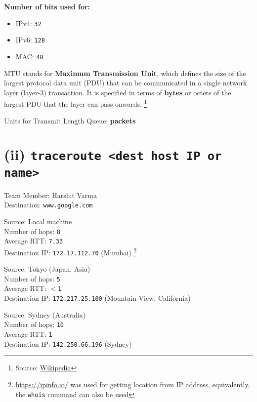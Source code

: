 \documentclass[11pt, fleqn]{article}
\begin{document}
\hrulefill
\medskip

\textbf{Number of bits used for:}
\begin{itemize}[itemsep=-1ex]
    \item IPv4: \texttt{32}
    \item IPv6: \texttt{128}
    \item MAC: \texttt{48}
\end{itemize}

\hrulefill
\medskip 

MTU stands for \textbf{Maximum Transmission Unit}, which defines the size of the largest protocol data unit (PDU) that can be communicated in a single network layer (layer-3) transaction. It is specified in terms of \textbf{bytes} or octets of the largest PDU that the layer can pass onwards. \footnote{Source:  \href{https://en.wikipedia.org/wiki/Maximum_transmission_unit}{Wikipedia} }

\hrulefill
\medskip

Units for Transmit Length Queue: \textbf{packets}


\newpage
\section*{(ii) \texttt{traceroute <dest host IP or name>}}
\label{partb}
\setcounter{equation}{0}

Team Member: Harshit Varma\\
Destination: \texttt{www.google.com}

\hrulefill
\smallskip

Source: Local machine\\
Number of hops: \texttt{8}\\
Average RTT: \texttt{7.33}\\
Destination IP: \texttt{172.17.112.70} (Mumbai) \footnote{\url{https://ipinfo.io/} was used for getting location from IP address, equivalently, the \texttt{whois} command can also be used}

\hrulefill
\smallskip

Source: Tokyo (Japan, Asia)\\
Number of hops: \texttt{5}\\
Average RTT: $<$\texttt{1}\\
Destination IP: \texttt{172.217.25.100} (Mountain View, California)

\hrulefill
\smallskip

Source: Sydney (Australia)\\
Number of hops: \texttt{10}\\
Average RTT: \texttt{1}\\
Destination IP: \texttt{142.250.66.196} (Sydney)
\end{document}
